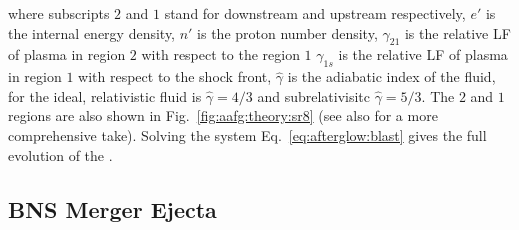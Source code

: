 %
where subscripts $2$ and $1$ stand for downstream and upstream respectively, 
$e'$ is the internal energy density, $n'$ is the proton number density, 
$\gamma_{21}$ is the relative \ac{LF} of plasma in region 
$2$ with respect to the region $1$
$\gamma_{1s}$ is the relative \ac{LF} of plasma in region $1$ with respect to the shock front,
$\hat{\gamma}$ is the adiabatic index of the fluid, for the ideal, relativistic 
fluid is $\hat{\gamma}=4/3$ and subrelativisitc $\hat{\gamma}=5/3$.
The $2$ and $1$ regions are also shown in Fig.~\ref{fig:aafg:theory:sr8} 
(see also \citep{Nava:2013} for a more comprehensive take).
%
Solving the system Eq.~\eqref{eq:afterglow:blast} gives the full evolution 
of the \blast{}. 




























\subsection{\ac{BNS} Merger Ejecta} \label{sec:intro:ejecta}





